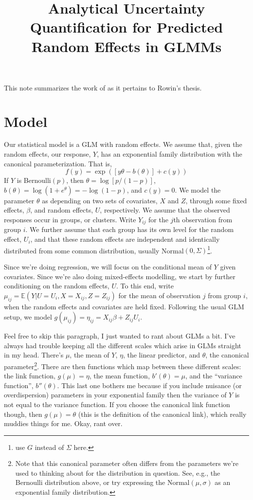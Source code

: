 \documentclass{article}
\title{Analytical Uncertainty Quantification for Predicted Random Effects in GLMMs}
\date{}
\newcommand{\bE}{\mathbb{E}}
\begin{document}
\maketitle

This note summarizes the work of \citet{Boo98} as it pertains to Rowin's thesis.

\section{Model}

Our statistical model is a GLM with random effects. We assume that, given the random effects, our response, $Y$, has an exponential family distribution with the canonical parameterization. That is,
%
\begin{equation}
    f(y) = \exp\left( \left[y \theta - b(\theta)\right] + c(y) \right) \label{eq:exp_dens}
\end{equation}
%
If $Y$ is Bernoulli$(p)$, then $\theta = \log[p/(1-p)]$, $b(\theta) = \log(1 + e^\theta) = -\log(1-p)$, and $c(y) = 0$. We model the parameter $\theta$ as depending on two sets of covariates, $X$ and $Z$, through some fixed effects, $\beta$, and random effects, $U$, respectively. We assume that the observed responses occur in groups, or clusters. Write $Y_{ij}$ for the $j$th observation from group $i$. We further assume that each group has its own level for the random effect, $U_i$, and that these random effects are independent and identically distributed from some common distribution, usually Normal$(0, \Sigma)$\footnote{\citeauthor{Boo98} use $G$ instead of $\Sigma$ here.}.


Since we're doing regression, we will focus on the conditional mean of $Y$ given covariates. Since we're also doing mixed-effects modelling, we start by further conditioning on the random effects, $U$. To this end, write $\mu_{ij} = \bE (Y |U = U_i, X = X_{ij}, Z = Z_{ij})$ for the mean of observation $j$ from group $i$, when the random effects and covariates are held fixed. Following the usual GLM setup, we model $g(\mu_{ij}) = \eta_{ij} = X_{ij} \beta + Z_{ij} U_i$. 

Feel free to skip this paragraph, I just wanted to rant about GLMs a bit. I've always had trouble keeping all the different scales which arise in GLMs straight in my head. There's $\mu$, the mean of $Y$, $\eta$, the linear predictor, and $\theta$, the canonical parameter\footnote{Note that this canonical parameter often differs from the parameters we're used to thinking about for the distribution in question. See, e.g., the Bernoulli distribution above, or try expressing the Normal$(\mu, \sigma)$ as an exponential family distribution.}. There are then functions which map between these different scales: the link function, $g(\mu) = \eta$, the mean function, $b'(\theta) = \mu$, and the ``variance function'', $b''(\theta)$. This last one bothers me because if you include nuisance (or overdispersion) parameters in your exponential family then the variance of $Y$ is not equal to the variance function. If you choose the canonical link function though, then $g(\mu) = \theta$ (this is the definition of the canonical link), which really muddies things for me. Okay, rant over.
\end{document}
